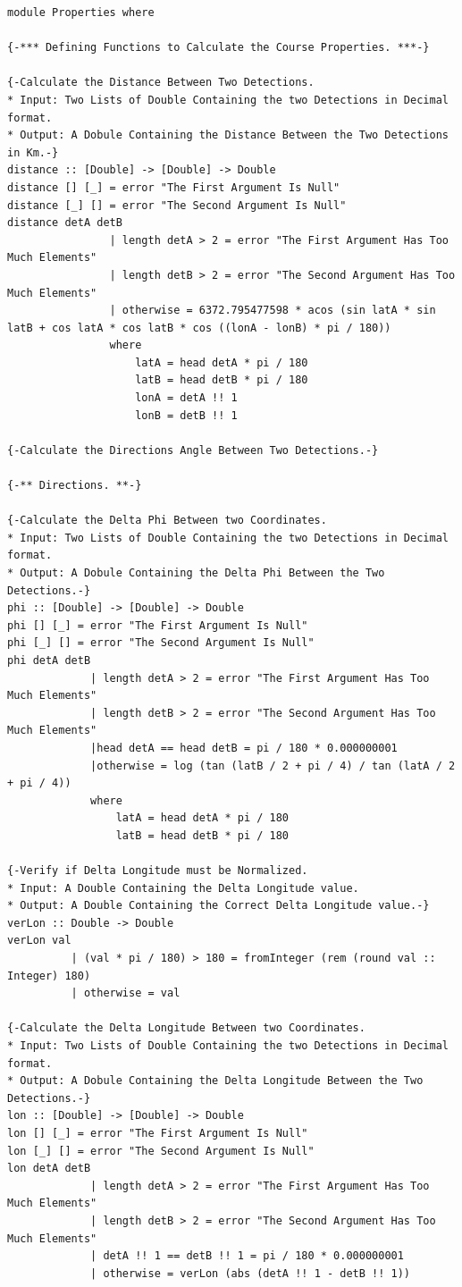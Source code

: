 \documentclass{article}
\begin{document}
\begin{lstlisting}
module Properties where

{-*** Defining Functions to Calculate the Course Properties. ***-}

{-Calculate the Distance Between Two Detections.
* Input: Two Lists of Double Containing the two Detections in Decimal format.
* Output: A Dobule Containing the Distance Between the Two Detections in Km.-}
distance :: [Double] -> [Double] -> Double 
distance [] [_] = error "The First Argument Is Null"
distance [_] [] = error "The Second Argument Is Null"
distance detA detB
                | length detA > 2 = error "The First Argument Has Too Much Elements"
                | length detB > 2 = error "The Second Argument Has Too Much Elements"
                | otherwise = 6372.795477598 * acos (sin latA * sin latB + cos latA * cos latB * cos ((lonA - lonB) * pi / 180))
                where
                    latA = head detA * pi / 180
                    latB = head detB * pi / 180
                    lonA = detA !! 1
                    lonB = detB !! 1

{-Calculate the Directions Angle Between Two Detections.-}

{-** Directions. **-}

{-Calculate the Delta Phi Between two Coordinates.
* Input: Two Lists of Double Containing the two Detections in Decimal format.
* Output: A Dobule Containing the Delta Phi Between the Two Detections.-}
phi :: [Double] -> [Double] -> Double 
phi [] [_] = error "The First Argument Is Null"
phi [_] [] = error "The Second Argument Is Null"
phi detA detB 
             | length detA > 2 = error "The First Argument Has Too Much Elements"
             | length detB > 2 = error "The Second Argument Has Too Much Elements"
             |head detA == head detB = pi / 180 * 0.000000001
             |otherwise = log (tan (latB / 2 + pi / 4) / tan (latA / 2 + pi / 4))
             where
                 latA = head detA * pi / 180
                 latB = head detB * pi / 180

{-Verify if Delta Longitude must be Normalized.
* Input: A Double Containing the Delta Longitude value.
* Output: A Double Containing the Correct Delta Longitude value.-}
verLon :: Double -> Double 
verLon val
          | (val * pi / 180) > 180 = fromInteger (rem (round val :: Integer) 180)   
          | otherwise = val

{-Calculate the Delta Longitude Between two Coordinates.
* Input: Two Lists of Double Containing the two Detections in Decimal format.
* Output: A Dobule Containing the Delta Longitude Between the Two Detections.-}
lon :: [Double] -> [Double] -> Double
lon [] [_] = error "The First Argument Is Null"
lon [_] [] = error "The Second Argument Is Null"
lon detA detB
             | length detA > 2 = error "The First Argument Has Too Much Elements"
             | length detB > 2 = error "The Second Argument Has Too Much Elements"
             | detA !! 1 == detB !! 1 = pi / 180 * 0.000000001
             | otherwise = verLon (abs (detA !! 1 - detB !! 1)) 


\end{lstlisting}
\end{document}

